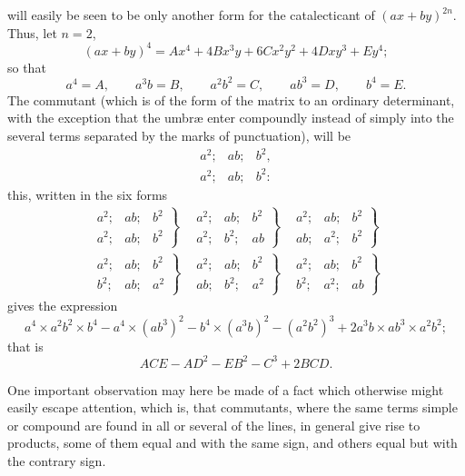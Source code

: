 \documentclass[11pt]{article}
\newcommand{\sourcepage}[1]{\marginpar{\scriptsize p.~#1}}
\begin{document}
{{\sourcepage{315}
will easily be seen to be only another form for the catalecticant of $(ax+by)^{2n}$. Thus, let $n=2$,
\[
(ax+by)^4=Ax^4+4Bx^3y+6Cx^2y^2+4Dxy^3+Ey^4;
\]
so that
\[
a^4=A,\qquad a^3b=B,\qquad a^2b^2=C,\qquad ab^3=D,\qquad b^4=E.
\]
The commutant (which is of the form of the matrix to an ordinary determinant, with the exception that the umbræ enter compoundly instead of simply into the several terms separated by the marks of punctuation), will be
\[
\begin{array}{ccc}
a^2;&ab;&b^2,\\
a^2;&ab;&b^2:
\end{array}
\]
this, written in the six forms
\[
\begin{array}{ccc}
\left.\begin{array}{ccc}a^2;&ab;&b^2\\a^2;&ab;&b^2\end{array}\right\}&
\left.\begin{array}{ccc}a^2;&ab;&b^2\\a^2;&b^2;&ab\end{array}\right\}&
\left.\begin{array}{ccc}a^2;&ab;&b^2\\ab;&a^2;&b^2\end{array}\right\}\\[1.0em]
\left.\begin{array}{ccc}a^2;&ab;&b^2\\b^2;&ab;&a^2\end{array}\right\}&
\left.\begin{array}{ccc}a^2;&ab;&b^2\\ab;&b^2;&a^2\end{array}\right\}&
\left.\begin{array}{ccc}a^2;&ab;&b^2\\b^2;&a^2;&ab\end{array}\right\}
\end{array}
\]
gives the expression
\[
a^4\times a^2b^2\times b^4-a^4\times(ab^3)^2-b^4\times(a^3b)^2-(a^2b^2)^3
+2a^3b\times ab^3\times a^2b^2;
\]
that is
\[
ACE-AD^2-EB^2-C^3+2BCD.
\]

One important observation may here be made of a fact which otherwise might easily escape attention, which is, that commutants, where the same terms simple or compound are found in all or several of the lines, in general give rise to products, some of them equal and with the same sign, and others equal but with the contrary sign.

}}
\end{document}
